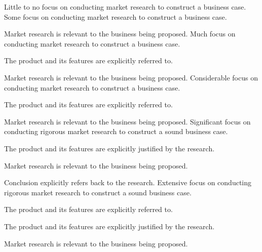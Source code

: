\documentclass{../fal_assignment}
\begin{document}
\begin{markingrubric}
%
%
        \grade  \fail	Little to no focus on conducting market research to construct a business case.
        \grade 		Some focus on conducting market research to construct a business case.
            \par 		Market research is relevant to the business being proposed.
        \grade 		Much focus on conducting market research to construct a business case.
            \par 		The product and its features are explicitly referred to.
            \par 		Market research is relevant to the business being proposed.
        \grade 		Considerable focus on conducting market research to construct a business case.
            \par 		The product and its features are explicitly referred to.
            \par 		Market research is relevant to the business being proposed.
        \grade 		Significant focus on conducting rigorous market research to construct a sound business case.
            \par 		The product and its features are explicitly justified by the research.
            \par 		Market research is relevant to the business being proposed.
            \par 		Conclusion explicitly refers back to the research.
        \grade 		Extensive focus on conducting rigorous market research to construct a sound business case.
            \par 		The product and its features are explicitly referred to.
            \par 		The product and its features are explicitly justified by the research.
            \par 		Market research is relevant to the business being proposed.

\end{markingrubric}
\end{document}
